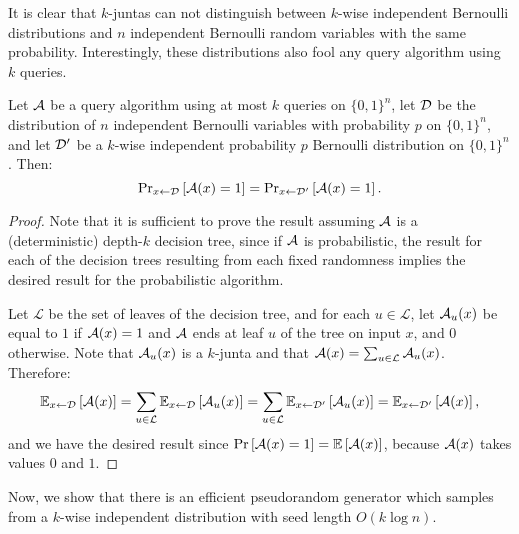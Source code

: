 
It is clear that $k$-juntas can not distinguish between $k$-wise independent Bernoulli distributions 
and $n$ independent Bernoulli random variables with the same probability. Interestingly, 
these distributions also fool any query algorithm using $k$ queries. 


\begin{theorem}
Let $\mathcal{A}$ be a query algorithm using at most $k$ queries on $\{0, 1\}^n$, 
let $\mathcal{D}$ be the distribution of $n$ independent 
Bernoulli variables with probability $p$ on $\{0, 1\}^n$, and let
$\mathcal{D}'$ be a $k$-wise independent probability $p$ Bernoulli distribution on $\{0, 1\}^n$. Then:
$$
\text{Pr}_{x \leftarrow \mathcal{D}}\left[\mathcal{A}(x) = 1\right] = \text{Pr}_{x \leftarrow \mathcal{D}'}\left[\mathcal{A}(x) = 1\right].
$$
\end{theorem}
\begin{proof}
Note that it is sufficient to prove the result assuming $\mathcal{A}$ is a (deterministic) depth-$k$ decision tree,
since if $\mathcal{A}$ is probabilistic, the result for each of the decision trees resulting from each fixed randomness
implies the desired result for the probabilistic algorithm.

Let $\mathcal{L}$ be the set of leaves of the decision tree, and for each $u \in \mathcal{L}$,
let $\mathcal{A}_u(x)$ be equal
to $1$ if $\mathcal{A}(x) = 1$ and $\mathcal{A}$ ends at leaf $u$ of the tree on input $x$, and $0$ otherwise.
Note that $\mathcal{A}_u(x)$ is a $k$-junta
and that $\mathcal{A}(x) = \sum_{u\in \mathcal{L}} \mathcal{A}_u(x)$. Therefore:
$$
\mathbb{E}_{x \leftarrow \mathcal{D}}\left[\mathcal{A}(x)\right] = \sum_{u \in \mathcal{L}} \mathbb{E}_{x \leftarrow \mathcal{D}}\left[\mathcal{A}_u(x)\right] = \sum_{u \in \mathcal{L}} \mathbb{E}_{x \leftarrow \mathcal{D}'}\left[\mathcal{A}_u(x)\right] = \mathbb{E}_{x \leftarrow \mathcal{D}'}\left[\mathcal{A}(x)\right],
$$
and we have the desired result since  $\text{Pr}\left[\mathcal{A}(x) = 1\right] = \mathbb{E}\left[\mathcal{A}(x)\right]$,
because $\mathcal{A}(x)$ takes values $0$ and $1$.
\end{proof}

Now, we show that there is an efficient pseudorandom generator which samples from a $k$-wise
independent distribution with seed length $O(k \log n)$.

